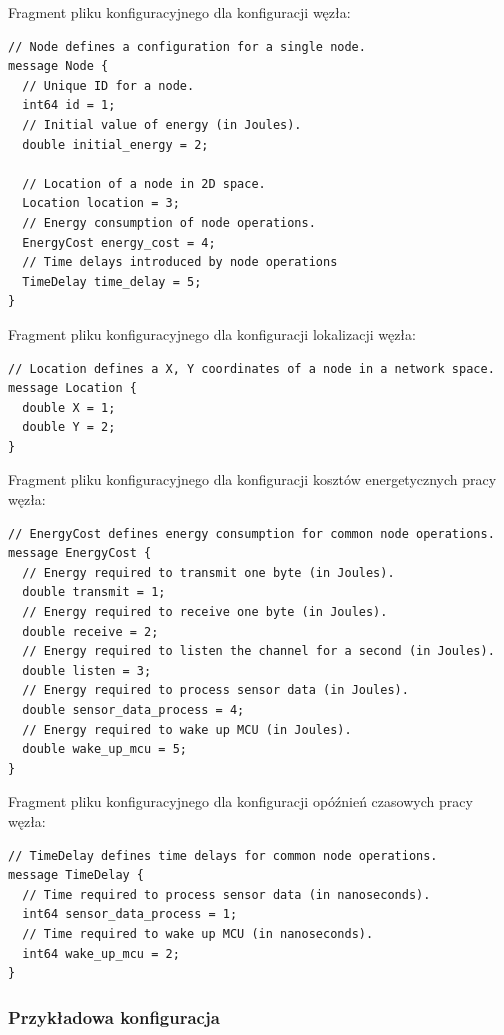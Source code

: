 \documentclass[a4paper,12pt,twoside,openany]{report}
\begin{document}
\newpage
Fragment pliku konfiguracyjnego dla konfiguracji węzła:

\begin{lstlisting}
// Node defines a configuration for a single node.
message Node {
  // Unique ID for a node.
  int64 id = 1;
  // Initial value of energy (in Joules). 
  double initial_energy = 2;

  // Location of a node in 2D space.
  Location location = 3;
  // Energy consumption of node operations.
  EnergyCost energy_cost = 4;
  // Time delays introduced by node operations
  TimeDelay time_delay = 5;
}
\end{lstlisting}

Fragment pliku konfiguracyjnego dla konfiguracji lokalizacji węzła:

\begin{lstlisting}
// Location defines a X, Y coordinates of a node in a network space.
message Location {
  double X = 1;
  double Y = 2;
}
\end{lstlisting}

Fragment pliku konfiguracyjnego dla konfiguracji kosztów energetycznych pracy węzła:

\begin{lstlisting}
// EnergyCost defines energy consumption for common node operations.
message EnergyCost {
  // Energy required to transmit one byte (in Joules).
  double transmit = 1;
  // Energy required to receive one byte (in Joules).
  double receive = 2;
  // Energy required to listen the channel for a second (in Joules).
  double listen = 3;
  // Energy required to process sensor data (in Joules).
  double sensor_data_process = 4;
  // Energy required to wake up MCU (in Joules).
  double wake_up_mcu = 5;
}
\end{lstlisting}

Fragment pliku konfiguracyjnego dla konfiguracji opóźnień czasowych pracy węzła:

\begin{lstlisting}
// TimeDelay defines time delays for common node operations.
message TimeDelay {
  // Time required to process sensor data (in nanoseconds).
  int64 sensor_data_process = 1;
  // Time required to wake up MCU (in nanoseconds).
  int64 wake_up_mcu = 2;
}
\end{lstlisting}

\subsubsection{Przykładowa konfiguracja}
\end{document}
